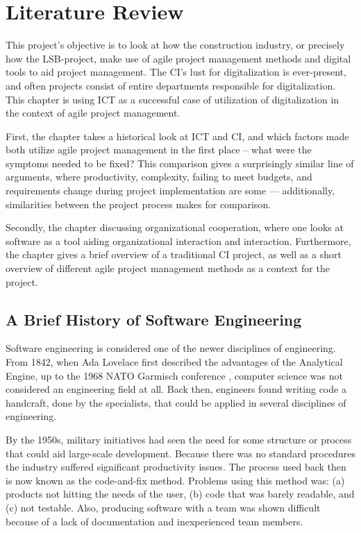 
\chapter{Literature Review}
This project's objective is to look at how the construction industry, or precisely how the LSB-project, make use of agile project management methods and digital tools to aid project management. The CI's lust for digitalization is ever-present, and often projects consist of entire departments responsible for digitalization. This chapter is using ICT as a successful case of utilization of digitalization in the context of agile project management. 

First, the chapter takes a historical look at ICT and CI, and which factors made both utilize agile project management in the first place – what were the symptoms needed to be fixed? This comparison gives a surprisingly similar line of arguments, where productivity, complexity, failing to meet budgets, and requirements change during project implementation are some — additionally, similarities between the project process makes for comparison. 

Secondly, the chapter discussing organizational cooperation, where one looks at software as a tool aiding organizational interaction and interaction. Furthermore, the chapter gives a brief overview of a traditional CI project, as well as a short overview of different agile project management methods as a context for the project.

\section{A Brief History of Software Engineering} \label{sec:ICT_history}
Software engineering is considered one of the newer disciplines of engineering. From 1842, when Ada Lovelace first described the advantages of the Analytical Engine, up to the 1968 NATO Garmisch conference \cite{naur1969software}, computer science was not considered an engineering field at all. Back then, engineers found writing code a handcraft, done by the specialists, that could be applied in several disciplines of engineering. 

By the 1950s, military initiatives had seen the need for some structure or process that could aid large-scale development. Because there was no standard procedures the industry suffered significant productivity issues. The process used back then is now known as the code-and-fix method. Problems using this method was: (a) products not hitting the needs of the user, (b) code that was barely readable, and (c) not testable. Also, producing software with a team was shown difficult because of a lack of documentation and inexperienced team members. 

